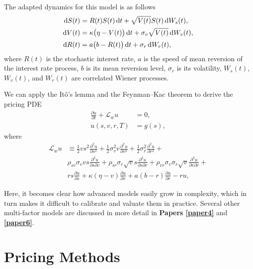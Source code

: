 \documentclass{UUThesisTemplate}
\begin{document}
\par
The adapted dynamics for this model is as follows
\begin{align}
\dif S(t) & =  R(t)S(t)\dif t + \sqrt{V(t)}S(t)\dif W_s(t), \label{hhwSDE1} \\
\dif V(t) & =  \kappa\big(\eta-V(t)\big)\dif t + \sigma_v \sqrt{V(t)}\dif W_v(t), \label{hhwSDE2} \\
\dif R(t) & = a\big(b-R(t)\big)\dif t + \sigma_r\dif W_r(t), {\color{white} \sqrt{V(t)}} \label{hhwSDE3}
\end{align}
where $R(t)$ is the stochastic interest rate, $a$ is the speed of mean reversion of the interest rate process, $b$ is its mean reversion level, $\sigma_r$ is its volatility,  $W_s(t)$, $W_v(t)$,  and $W_r(t)$ are correlated Wiener processes.

\par
We can apply the It\^{o}'s lemma and the Feynman--Kac theorem to derive the pricing PDE
\begin{align}
\frac{\partial u}{\partial t}+\mathcal{L}_w u&=0, \nonumber \\
u(s,v,r,T) &= g(s), \label{hhwPDE}
\end{align}
where
\begin{align}
\mathcal{L}_{w} u &\equiv  \frac{1}{2}vs^2\frac{\partial^2 u}{\partial s^2} + \frac{1}{2}\sigma_v^2v\frac{\partial^2 u}{\partial v^2}  + \frac{1}{2}\sigma_r^2\frac{\partial^2 u}{\partial r^2} + \nonumber \\
                             & \rho_{sv}\sigma_v vs\frac{\partial^2 u}{\partial s\partial v} + \rho_{sr}\sigma_r \sqrt{v} s\frac{\partial^2 u}{\partial s\partial r} + \rho_{vr}\sigma_v\sigma_r \sqrt{v}\frac{\partial^2 u}{\partial v\partial r} + \nonumber \\
                             & rs\frac{\partial u}{\partial s} + \kappa(\eta-v)\frac{\partial u}{\partial v} + a(b-r)\frac{\partial u}{\partial r} - ru, \label{eqHHWop}
\end{align}

\par
Here, it becomes clear how advanced models easily grow in complexity, which in turn makes it difficult to calibrate and valuate them in practice. Several other multi-factor models are discussed in more detail in \textbf{Papers \ref{paper4}} and \textbf{\ref{paper6}}. 
%





%
\section{Pricing Methods}
\label{sec:methods}
\end{document}

